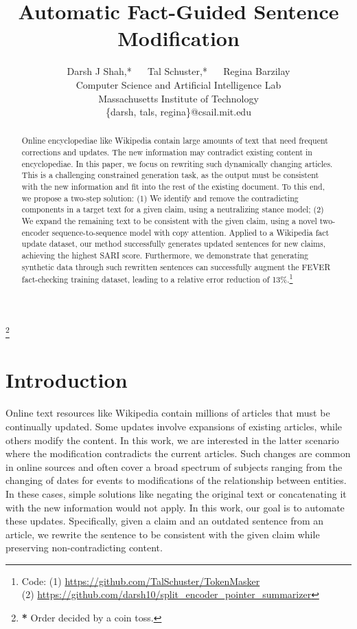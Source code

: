 \documentclass[letterpaper]{article}
\title{Automatic Fact-Guided Sentence Modification}
\author{Darsh J Shah,* ~~ Tal Schuster,*  ~~ Regina Barzilay\\
  \mbox{}
Computer Science and Artificial Intelligence Lab\\
Massachusetts Institute of Technology \\
\{darsh, tals, regina\}@csail.mit.edu
}
\begin{document}
\maketitle
\let\svthefootnote\thefootnote
\let\thefootnote\relax\footnote{\textbf{*} Order decided by a coin toss.}
\addtocounter{footnote}{-1}
\let\thefootnote\svthefootnote
\begin{abstract}
Online encyclopediae like Wikipedia contain large amounts of text that need frequent corrections and updates. The new information may contradict existing content in encyclopediae. In this paper, we focus on rewriting such dynamically changing articles. This is a challenging constrained generation task, as the output must be consistent with the new information and fit into the rest of the existing document. To this end, we propose a two-step solution: (1) We identify and remove the contradicting components in a target text for a given claim, using a neutralizing stance model; (2) We expand the remaining text to be consistent with the given claim, using a novel two-encoder sequence-to-sequence model with copy attention. Applied to a Wikipedia fact update dataset, our method successfully generates updated sentences for new claims, achieving the highest SARI score. Furthermore, we demonstrate that generating synthetic data through such rewritten sentences can successfully augment the FEVER fact-checking training dataset, leading to a relative error reduction of 13\%.\footnote{ Code: (1) \url{https://github.com/TalSchuster/TokenMasker}\\ (2) \url{https://github.com/darsh10/split_encoder_pointer_summarizer}}







\end{abstract}
\section{Introduction}
\label{sec:introduction}
Online text resources like Wikipedia contain millions of articles that must be continually updated. Some updates involve expansions of existing articles, while others modify the content. In this work, we are interested in the latter scenario where the modification contradicts the current articles. Such changes are common in online sources and often cover a broad spectrum of subjects ranging from the changing of dates for events to modifications of the relationship between entities. In these cases, simple solutions like negating the original text or concatenating it with the new information would not apply. In this work, our goal is to automate these updates. Specifically, given a claim and an outdated sentence from an article, we rewrite the sentence to be consistent with the given claim while preserving non-contradicting content.
\end{document}

